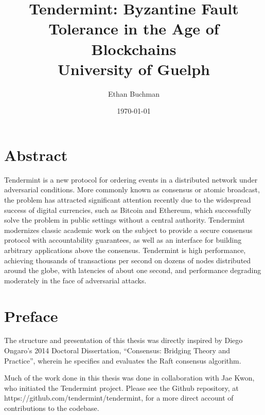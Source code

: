 \documentclass[12pt]{report}
\begin{document}
\title{
	{Tendermint: Byzantine Fault Tolerance in the Age of Blockchains}\\
	{\large University of Guelph}\\
}

\author{Ethan Buchman}
\date{\today}

\maketitle

\clearpage

\chapter*{Abstract}
Tendermint is a new protocol for ordering events in a distributed network under adversarial conditions.
More commonly known as consensus or atomic broadcast, the problem has attracted significant attention
recently due to the widespread success of digital currencies, such as Bitcoin and Ethereum,
which successfully solve the problem in public settings without a central authority.
Tendermint modernizes classic academic work on the subject to provide a secure consensus protocol with 
accountability guarantees, as well as an interface for building arbitrary applications above the consensus.
Tendermint is high performance, achieving thousands of transactions per second on dozens of nodes distributed around the globe,
with latencies of about one second, and performance degrading moderately in the face of adversarial attacks.

\thispagestyle{plain}
\par\vspace*{.35\textheight}{\centering Dedicated to Theda. \par}

\chapter*{Preface}
The structure and presentation of this thesis was directly inspired by Diego Ongaro's 2014 Doctoral Dissertation, 
``Consensus: Bridging Theory and Practice'', wherein he specifies and evaluates the Raft consensus algorithm.

Much of the work done in this thesis was done in collaboration with Jae Kwon, who initiated the Tendermint project.
Please see the Github repository, at https://github.com/tendermint/tendermint, for a more direct account of contributions to the codebase.
\end{document}
